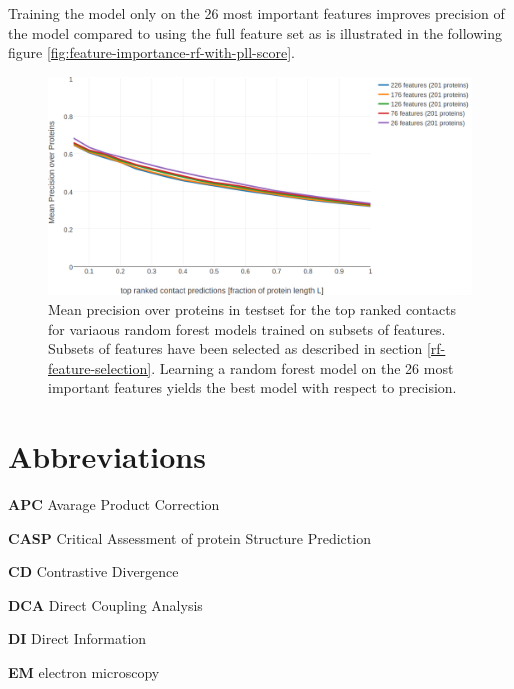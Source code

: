\documentclass[12pt,a4paper,twoside]{book}
\theoremstyle{definition}
\theoremstyle{definition}
\theoremstyle{remark}
\begin{document}
Training the model only on the 26 most important features improves
precision of the model compared to using the full feature set as is
illustrated in the following figure
\ref{fig:feature-importance-rf-with-pll-score}.








\begin{figure}

{\centering \includegraphics[width=0.9\linewidth]{img/random_forest_contact_prior/precision_vs_rank_featureselection_plll2norm_random_forest_nestimators1000_maxfeaturesauto_26features_notitle} 

}

\caption{Mean precision over
proteins in testset for the top ranked contacts for variaous random
forest models trained on subsets of features. Subsets of features have
been selected as described in section \ref{rf-feature-selection}.
Learning a random forest model on the 26 most important features yields
the best model with respect to precision.}\label{fig:feature-selection-rf-with-pll-score}
\end{figure}

\appendix


\hypertarget{abbrev}{\chapter{Abbreviations}\label{abbrev}}

\textbf{APC} Avarage Product Correction

\textbf{CASP} Critical Assessment of protein Structure Prediction

\textbf{CD} Contrastive Divergence

\textbf{DCA} Direct Coupling Analysis

\textbf{DI} Direct Information

\textbf{EM} electron microscopy
\end{document}
